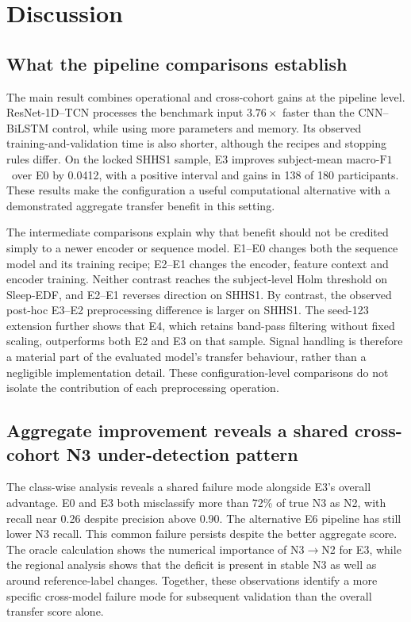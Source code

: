 \documentclass[11pt,a4paper]{article}
\newcommand{\mf}{\ensuremath{\mathrm{macro\text{-}F1}}}
\begin{document}
\section{Discussion}

\subsection{What the pipeline comparisons establish}

The main result combines operational and cross-cohort gains at the pipeline level. ResNet-1D--TCN
processes the benchmark input $3.76\times$ faster than the CNN--BiLSTM control,
while using more parameters and memory. Its observed training-and-validation time is also shorter,
although the recipes and stopping rules differ. On the locked SHHS1 sample, E3 improves subject-mean
\mf\ over E0 by 0.0412, with a positive interval and gains in 138 of 180 participants. These results
make the configuration a useful computational alternative with a demonstrated aggregate transfer
benefit in this setting.

The intermediate comparisons explain why that benefit should not be credited simply to a newer
encoder or sequence model. E1--E0 changes both the sequence model and its training recipe;
E2--E1 changes the encoder, feature context and encoder training. Neither contrast reaches the
subject-level Holm threshold on Sleep-EDF, and E2--E1 reverses direction on SHHS1. By contrast,
the observed post-hoc E3--E2 preprocessing difference is larger on SHHS1. The seed-123 extension
further shows that E4, which retains band-pass filtering without fixed scaling, outperforms both E2
and E3 on that sample. Signal handling is therefore a material part of the evaluated model's transfer
behaviour, rather than a negligible implementation detail. These configuration-level comparisons do
not isolate the contribution of each preprocessing operation.

\subsection{Aggregate improvement reveals a shared cross-cohort N3 under-detection pattern}

The class-wise analysis reveals a shared failure mode alongside E3's overall advantage. E0 and E3 both
misclassify more than 72\% of true N3 as N2, with recall near 0.26 despite precision above 0.90.
The alternative E6 pipeline has still lower N3 recall. This common failure persists despite the better
aggregate score. The oracle calculation shows the numerical importance of
N3$\rightarrow$N2 for E3, while the regional analysis shows that the deficit is present in stable
N3 as well as around reference-label changes. Together, these observations identify a more specific
cross-model failure mode for subsequent validation than the overall transfer score alone.
\end{document}
